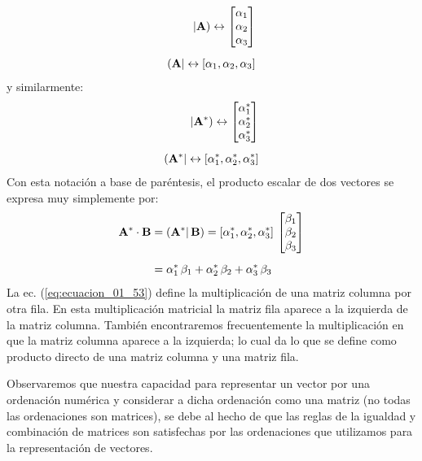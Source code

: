 \documentclass[12pt]{article}
\begin{document}
\begin{align}
\begin{aligned}
    | \vb{A} ) \leftrightarrow \mqty[ \alpha_{1} \\ \alpha_{2} \\ \alpha_{3} ] \\[0.5em]
    ( \vb{A} | \leftrightarrow  \left[ \alpha_{1}, \alpha_{2}, \alpha_{3} \right]
\end{aligned}
\label{eq:ecuacion_01_51}
\end{align}
y similarmente:
\begin{align}
\begin{aligned}
    | \vb{A}^{*} ) \leftrightarrow \mqty[ \alpha_{1}^{*} \\ \alpha_{2}^{*} \\ \alpha_{3}^{*} ] \\[0.5em]
    ( \vb{A}^{*} | \leftrightarrow  \left[ \alpha_{1}^{*}, \alpha_{2}^{*}, \alpha_{3}^{*} \right]
\end{aligned}
\label{eq:ecuacion_01_52}
\end{align}
Con esta notación a base de paréntesis, el producto escalar de dos vectores se expresa muy simplemente por:
\begin{align}
\begin{aligned}
\vb{A}^{*} \cdot \vb{B} &= \left( \vb{A}^{*} | \, \vb{B} \right) = \left[ \alpha_{1}^{*}, \alpha_{2}^{*}, \alpha_{3}^{*} \right] \, \mqty[ \beta_{1} \\ \beta_{2} \\ \beta_{3} ] \\[0.5em]
&= \alpha_{1}^{*} \, \beta_{1} + \alpha_{2}^{*} \, \beta_{2} + \alpha_{3}^{*} \, \beta_{3}
\end{aligned}
\label{eq:ecuacion_01_53}
\end{align}
La ec. (\ref{eq:ecuacion_01_53}) define la multiplicación de una matriz columna por otra fila. En esta multiplicación matricial la matriz fila aparece a la izquierda de la matriz columna. También encontraremos frecuentemente la multiplicación en que la matriz columna aparece a la izquierda; lo cual da lo que se define como producto directo de una matriz columna y una matriz fila. 
\par
Observaremos que nuestra capacidad para representar un vector por una ordenación numérica y considerar a dicha ordenación como una matriz 
(no todas las ordenaciones son matrices), se debe al hecho de que las reglas de la igualdad y combinación de matrices son satisfechas por las ordenaciones que utilizamos para la representación de vectores.
\end{document}
